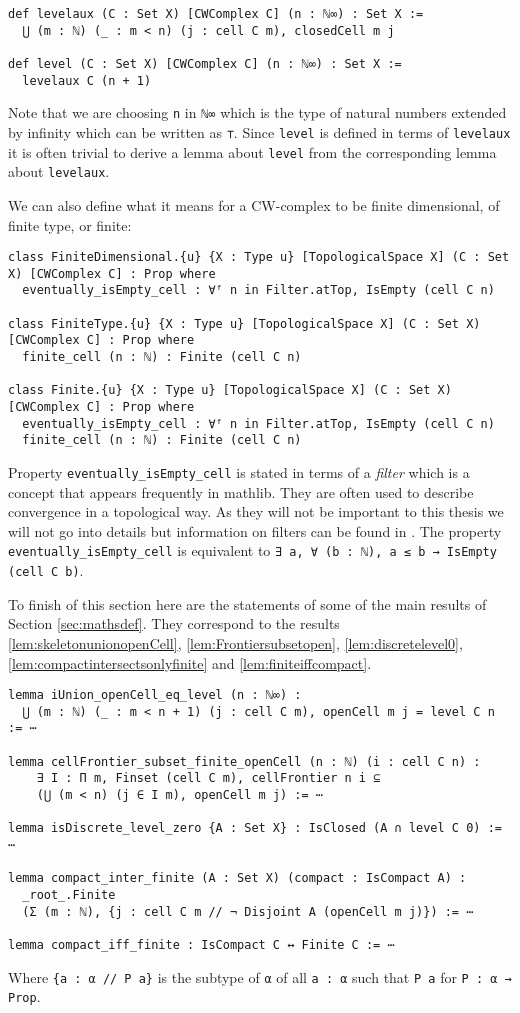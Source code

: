 \begin{lstlisting}
def levelaux (C : Set X) [CWComplex C] (n : ℕ∞) : Set X :=
  ⋃ (m : ℕ) (_ : m < n) (j : cell C m), closedCell m j

def level (C : Set X) [CWComplex C] (n : ℕ∞) : Set X :=
  levelaux C (n + 1)
\end{lstlisting}

Note that we are choosing \lstinline{n} in \lstinline{ℕ∞} which is the type of natural numbers extended by infinity which can be written as \lstinline{⊤}.
Since \lstinline{level} is defined in terms of \lstinline{levelaux} it is often trivial to derive a lemma about \lstinline{level} from the corresponding lemma about \lstinline{levelaux}.

We can also define what it means for a CW-complex to be finite dimensional, of finite type, or finite:

\begin{lstlisting}
class FiniteDimensional.{u} {X : Type u} [TopologicalSpace X] (C : Set X) [CWComplex C] : Prop where
  eventually_isEmpty_cell : ∀ᶠ n in Filter.atTop, IsEmpty (cell C n)

class FiniteType.{u} {X : Type u} [TopologicalSpace X] (C : Set X) [CWComplex C] : Prop where
  finite_cell (n : ℕ) : Finite (cell C n)

class Finite.{u} {X : Type u} [TopologicalSpace X] (C : Set X) [CWComplex C] : Prop where
  eventually_isEmpty_cell : ∀ᶠ n in Filter.atTop, IsEmpty (cell C n)
  finite_cell (n : ℕ) : Finite (cell C n)
\end{lstlisting}

Property \lstinline{eventually_isEmpty_cell} is stated in terms of a \emph{filter} which is a concept that appears frequently in mathlib.
They are often used to describe convergence in a topological way.
As they will not be important to this thesis we will not go into details but information on filters can be found in \cite{Bourbaki1966}.
The property \lstinline{eventually_isEmpty_cell} is equivalent to \lstinline{∃ a, ∀ (b : ℕ), a ≤ b → IsEmpty (cell C b)}.

To finish of this section here are the statements of some of the main results of Section \ref{sec:mathsdef}.
They correspond to the results \ref{lem:skeletonunionopenCell}, \ref{lem:Frontiersubsetopen}, \ref{lem:discretelevel0}, \ref{lem:compactintersectsonlyfinite} and \ref{lem:finiteiffcompact}.

\begin{lstlisting}
lemma iUnion_openCell_eq_level (n : ℕ∞) :
  ⋃ (m : ℕ) (_ : m < n + 1) (j : cell C m), openCell m j = level C n := ⋯

lemma cellFrontier_subset_finite_openCell (n : ℕ) (i : cell C n) :
    ∃ I : Π m, Finset (cell C m), cellFrontier n i ⊆
    (⋃ (m < n) (j ∈ I m), openCell m j) := ⋯

lemma isDiscrete_level_zero {A : Set X} : IsClosed (A ∩ level C 0) := ⋯

lemma compact_inter_finite (A : Set X) (compact : IsCompact A) :
  _root_.Finite
  (Σ (m : ℕ), {j : cell C m // ¬ Disjoint A (openCell m j)}) := ⋯

lemma compact_iff_finite : IsCompact C ↔ Finite C := ⋯
\end{lstlisting}

Where \lstinline|{a : α // P a}| is the subtype of \lstinline{α} of all \lstinline{a : α} such that \lstinline{P a} for \lstinline{P : α → Prop}.
